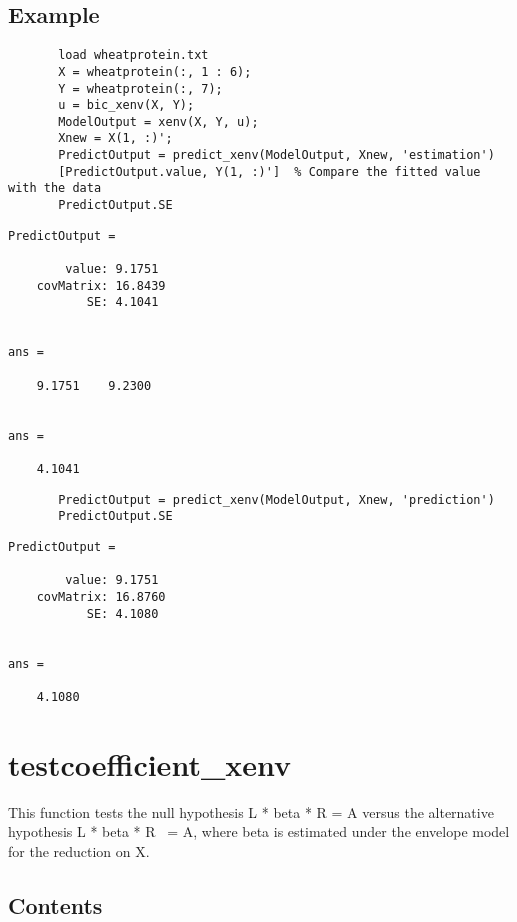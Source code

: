 \documentclass[a4paper,11pt,openany]{memoir}
\begin{document}
\subsection*{Example}


\begin{verbatim}       load wheatprotein.txt
       X = wheatprotein(:, 1 : 6);
       Y = wheatprotein(:, 7);
       u = bic_xenv(X, Y);
       ModelOutput = xenv(X, Y, u);
       Xnew = X(1, :)';
       PredictOutput = predict_xenv(ModelOutput, Xnew, 'estimation')
       [PredictOutput.value, Y(1, :)']  % Compare the fitted value with the data
       PredictOutput.SE\end{verbatim}
        \color{lightgray}\ttfamily \begin{verbatim}
PredictOutput = 

        value: 9.1751
    covMatrix: 16.8439
           SE: 4.1041


ans =

    9.1751    9.2300


ans =

    4.1041
\end{verbatim} \rmfamily
\color{black}
       
       \begin{verbatim}
       PredictOutput = predict_xenv(ModelOutput, Xnew, 'prediction')
       PredictOutput.SE\end{verbatim}

\color{lightgray}\ttfamily \begin{verbatim}
PredictOutput = 

        value: 9.1751
    covMatrix: 16.8760
           SE: 4.1080


ans =

    4.1080

\end{verbatim} \rmfamily
\color{black}

\newpage

\rmfamily
\color{black}\section{testcoefficient\_xenv}


This function tests the null hypothesis L * beta * R = A versus the
alternative hypothesis L * beta * R ~= A, where beta is estimated under
the envelope model for the reduction on X.
    
\subsection*{Contents}
\end{document}
